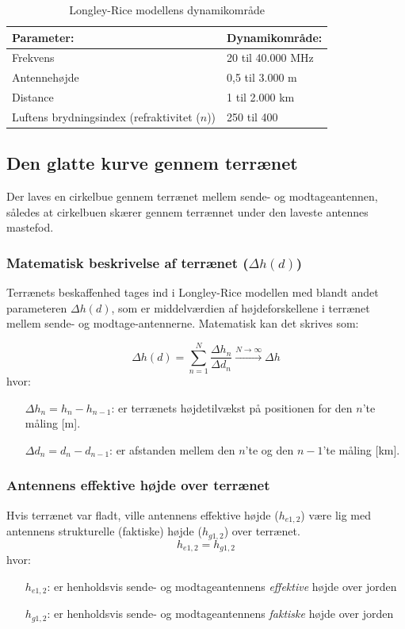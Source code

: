 \begin{table}[h]
 \centering
 \begin{tabular}{ll}
   Parameter:                                   & Dynamikområde:\\
   \hline
   Frekvens                                     & 20 til 40.000 MHz\\
   Antennehøjde                                 & 0,5 til 3.000 m \\
   Distance                                     & 1 til 2.000 km \\
   Luftens brydningsindex (refraktivitet ($n$)) & 250 til 400 \\
 \end{tabular}
 \caption{Longley-Rice modellens dynamikområde}
 \label{tab:lr-range}
\end{table}
\FloatBarrier
\subsection{Den glatte kurve gennem terrænet}
Der laves en cirkelbue gennem terrænet mellem sende- og modtageantennen, således at cirkelbuen skærer gennem terrænnet under den laveste antennes mastefod. 

\subsubsection{Matematisk beskrivelse af terrænet ($\Delta h(d)$)}
Terrænets beskaffenhed tages ind i Longley-Rice modellen med blandt andet parameteren $\Delta h(d)$, som er middelværdien af højdeforskellene i terrænet mellem sende- og modtage-antennerne. Matematisk kan det skrives som:

\begin{equation}
\Delta h(d) = \sum\limits_{n=1}^N \frac{\Delta h_n}{\Delta d_n} \xrightarrow {N\rightarrow \infty} \Delta h
\end{equation}
hvor:
\begin{itemize}
	\item [$\Delta h_n = h_n - h_{n-1}$:] er terrænets højdetilvækst på positionen for den $n$'te måling [m]. 
	\item [$\Delta d_n = d_n - d_{n-1}$:] er afstanden mellem den $n$'te og den $n-1$'te måling [km]. 
\end{itemize}


\subsubsection{Antennens effektive højde over terrænet}
Hvis terrænet var fladt, ville antennens effektive højde ($h_{e1,2}$) være lig med antennens strukturelle (faktiske) højde ($h_{g1,2}$) over terrænet.  
\begin{equation}
h_{e1,2} = h_{g1,2}
\end{equation}
hvor:
\begin{itemize}
	\item [$h_{e1,2}$:] er henholdsvis sende- og modtageantennens \emph{effektive} højde over jorden 
	\item [$h_{g1,2}$:] er henholdsvis sende- og modtageantennens \emph{faktiske} højde over jorden 
\end{itemize}


